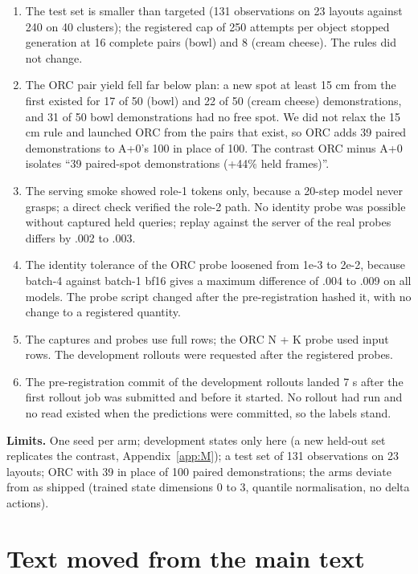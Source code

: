 \begin{enumerate}
\item The test set is smaller than targeted (131 observations on 23 layouts against 240 on 40 clusters); the registered cap of 250 attempts per object stopped generation at 16 complete pairs (bowl) and 8 (cream cheese). The rules did not change.
\item The ORC pair yield fell far below plan: a new spot at least 15 cm from the first existed for 17 of 50 (bowl) and 22 of 50 (cream cheese) demonstrations, and 31 of 50 bowl demonstrations had no free spot. We did not relax the 15 cm rule and launched ORC from the pairs that exist, so ORC adds 39 paired demonstrations to A+0's 100 in place of 100. The contrast ORC minus A+0 isolates ``39 paired-spot demonstrations (+44\% held frames)''.
\item The \pizero{} serving smoke showed role-1 tokens only, because a 20-step model never grasps; a direct check verified the role-2 path. No identity probe was possible without captured held queries; replay against the server of the real probes differs by .002 to .003.
\item The identity tolerance of the ORC probe loosened from 1e-3 to 2e-2, because batch-4 against batch-1 bf16 gives a maximum difference of .004 to .009 on all models. The probe script changed after the pre-registration hashed it, with no change to a registered quantity.
\item The captures and probes use full rows; the ORC N + K probe used input rows. The \pizero{} development rollouts were requested after the registered probes.
\item The pre-registration commit of the \pizero{} development rollouts landed 7 s after the first rollout job was submitted and before it started. No rollout had run and no read existed when the predictions were committed, so the labels stand.
\end{enumerate}

\textbf{Limits.} One seed per arm; development states only here (a new held-out set replicates the \pizero{} contrast, Appendix~\ref{app:M}); a test set of 131 observations on 23 layouts; ORC with 39 in place of 100 paired demonstrations; the \pizero{} arms deviate from \pizero{} as shipped (trained state dimensions 0 to 3, quantile normalisation, no delta actions).

\section{Text moved from the main text}
\label{app:L}


